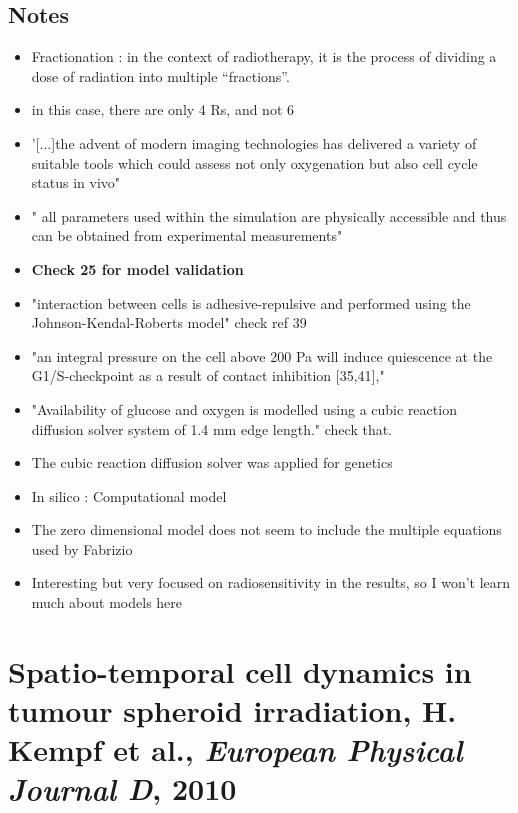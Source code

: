 \documentclass[11pt,a4paper]{article}
\begin{document}
\subsection*{Notes}
\begin{itemize}
\item Fractionation : in the context of radiotherapy, it is the process of dividing a dose of radiation into multiple “fractions”. 
\item in this case, there are only 4 Rs, and not 6
\item '[...]the advent of modern imaging technologies has delivered a variety of suitable tools which could assess not only oxygenation but also cell cycle status in vivo"
\item " all parameters used within the simulation are physically accessible and thus can be obtained from experimental measurements"
\item \textbf{Check 25 for model validation}
\item "interaction between cells is adhesive-repulsive and performed using the Johnson-Kendal-Roberts model" check ref 39
\item "an integral pressure on the cell above 200 Pa will induce quiescence at the G1/S-checkpoint as a result of contact inhibition [35,41],"
\item "Availability of glucose and oxygen is modelled using a cubic reaction diffusion solver system of 1.4 mm edge length." check that.
\item The cubic reaction diffusion solver was applied for genetics
\item In silico : Computational model
\item The zero dimensional model does not seem to include the multiple equations used by Fabrizio
\item Interesting but very focused on radiosensitivity in the results, so I won't learn much about models here
\end{itemize}

\section*{Spatio-temporal cell dynamics in tumour spheroid irradiation, H. Kempf et al., \textit{European Physical Journal  D}, 2010}
\end{document}

